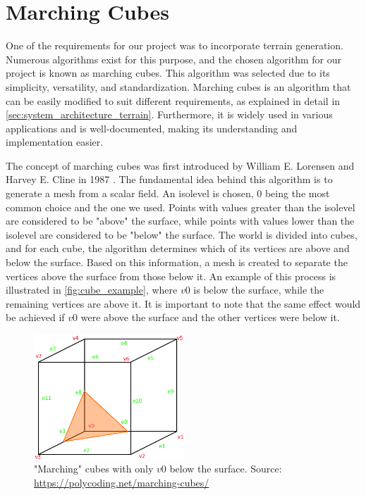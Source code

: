 \section{Marching Cubes} \label{sec:theory_theory_marching_cubes}
One of the requirements for our project was to incorporate terrain generation.
Numerous algorithms exist for this purpose, and the chosen algorithm for our project is known as marching cubes.
This algorithm was selected due to its simplicity, versatility, and standardization.
Marching cubes is an algorithm that can be easily modified to suit different requirements, as explained in detail in \autoref{sec:system_architecture_terrain}.
Furthermore, it is widely used in various applications and is well-documented, making its understanding and implementation easier.

The concept of marching cubes was first introduced by William E. Lorensen and Harvey E. Cline in 1987 \cite{Marching-Cubes}.
The fundamental idea behind this algorithm is to generate a mesh from a scalar field.
An isolevel is chosen, 0 being the most common choice and the one we used.
Points with values greater than the isolevel are considered to be "above" the surface, while points with values lower than the isolevel are considered to be "below" the surface.
The world is divided into cubes, and for each cube, the algorithm determines which of its vertices are above and below the surface.
Based on this information, a mesh is created to separate the vertices above the surface from those below it.
An example of this process is illustrated in \autoref{fig:cube_example}, where $v0$ is below the surface, while the remaining vertices are above it.
It is important to note that the same effect would be achieved if $v0$ were above the surface and the other vertices were below it.

\begin{figure}[h]
    \centering
    \includegraphics[width=0.5\textwidth]{chapters/theoretical_foundations/sections/marching_cubes/resources/cube-example.png}
    \caption["Marching" cubes with only $v0$ below the surface.]{"Marching" cubes with only $v0$ below the surface. Source: \url{https://polycoding.net/marching-cubes/}}
    \label{fig:cube_example}
\end{figure}

